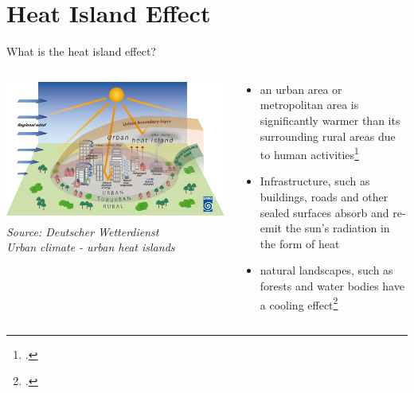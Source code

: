 
\section{Heat Island Effect}
\begin{frame}{What is the heat island effect?}
	\begin{columns}[T] %
		\begin{column}{.48\textwidth}
			\includegraphics[width=\linewidth]{images/urbanheatisland_01.png}\\
			\textit{\footnotesize Source: Deutscher Wetterdienst\\Urban climate - urban heat islands}
		\end{column}%
		\hfill%
		\begin{column}{.56\textwidth}
			\begin{itemize}
				\item \glqq{}{[\textellipsis]} an urban area or metropolitan area is significantly warmer than its surrounding rural areas due to human activities\grqq{}\footcite{takebayashi_chapter_2020}
				\item Infrastructure, such as buildings, roads and other sealed surfaces absorb and re-emit the sun's radiation in the form of heat
				\item natural landscapes, such as forests and water bodies have a cooling effect\footcite{us_epa_learn_2014}
			\end{itemize}
		\end{column}%
	\end{columns}
\end{frame}
